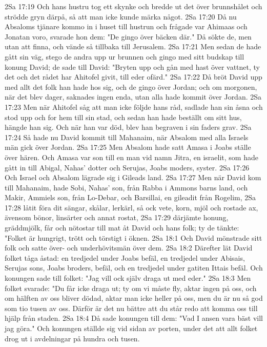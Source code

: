 2Sa 17:19  Och hans hustru tog ett skynke och bredde ut det över brunnshålet och strödde gryn därpå, så att man icke kunde märka något.
2Sa 17:20  Då nu Absaloms tjänare kommo in i huset till hustrun och frågade var Ahimaas och Jonatan voro, svarade hon dem: "De gingo över bäcken där." Då sökte de, men utan att finna, och vände så tillbaka till Jerusalem.
2Sa 17:21  Men sedan de hade gått sin väg, stego de andra upp ur brunnen och gingo med sitt budskap till konung David; de sade till David: "Bryten upp och gån med hast över vattnet, ty det och det rådet har Ahitofel givit, till eder ofärd."
2Sa 17:22  Då bröt David upp med allt det folk han hade hos sig, och de gingo över Jordan; och om morgonen, när det blev dager, saknades ingen enda, utan alla hade kommit över Jordan.
2Sa 17:23  Men när Ahitofel såg att man icke följde hans råd, sadlade han sin åsna och stod upp och for hem till sin stad, och sedan han hade beställt om sitt hus, hängde han sig. Och när han var död, blev han begraven i sin faders grav.
2Sa 17:24  Så hade nu David kommit till Mahanaim, när Absalom med alla Israels män gick över Jordan.
2Sa 17:25  Men Absalom hade satt Amasa i Joabs ställe över hären. Och Amasa var son till en man vid namn Jitra, en israelit, som hade gått in till Abigal, Nahas' dotter och Serujas, Joabs moders, syster.
2Sa 17:26  Och Israel och Absalom lägrade sig i Gileads land.
2Sa 17:27  Men när David kom till Mahanaim, hade Sobi, Nahas' son, från Rabba i Ammons barns land, och Makir, Ammiels son, från Lo-Debar, och Barsillai, en gileadit från Rogelim,
2Sa 17:28  låtit föra dit sängar, skålar, lerkärl, så ock vete, korn, mjöl och rostade ax, ävensom bönor, linsärter och annat rostat,
2Sa 17:29  därjämte honung, gräddmjölk, får och nötostar till mat åt David och hans folk; ty de tänkte: "Folket är hungrigt, trött och törstigt i öknen.
2Sa 18:1  Och David mönstrade sitt folk och satte över- och underhövitsmän över dem.
2Sa 18:2  Därefter lät David folket tåga åstad: en tredjedel under Joabs befäl, en tredjedel under Abisais, Serujas sons, Joabs broders, befäl, och en tredjedel under gatiten Ittais befäl. Och konungen sade till folket: "Jag vill ock själv draga ut med eder."
2Sa 18:3  Men folket svarade: "Du får icke draga ut; ty om vi måste fly, aktar ingen på oss, och om hälften av oss bliver dödad, aktar man icke heller på oss, men du är nu så god som tio tusen av oss. Därför är det nu bättre att du står redo att komma oss till hjälp från staden.
2Sa 18:4  Då sade konungen till dem: "Vad I ansen vara bäst vill jag göra." Och konungen ställde sig vid sidan av porten, under det att allt folket drog ut i avdelningar på hundra och tusen.
